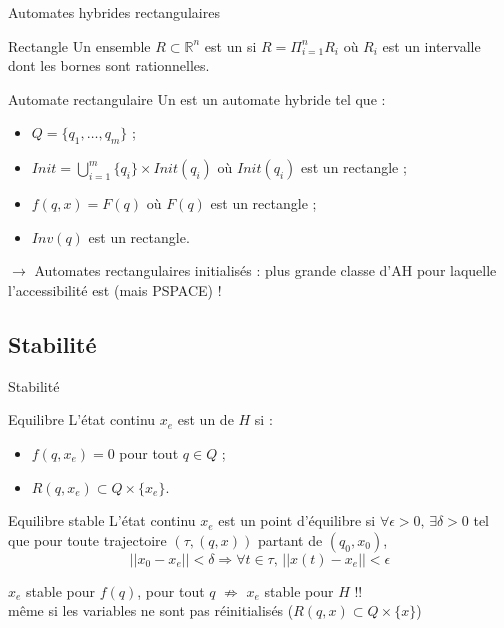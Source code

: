 \documentclass[compress]{beamer}
\begin{document}
\begin{frame}{Automates hybrides rectangulaires}
\begin{block}{Rectangle}
Un ensemble $R \subset \mathbb{R}^n$ est un  si $R = \Pi_{i=1}^n R_i$ où $R_i$ est un intervalle dont les bornes sont rationnelles.
\end{block}
\begin{block}{Automate rectangulaire}
Un  est un automate hybride tel que :
\begin{itemize}
\item $Q = \{q_1, \dots, q_m\}$ ;
\item $Init = \bigcup_{i=1}^m \{q_i\} \times Init(q_i)$ où $Init(q_i)$ est un rectangle ;
\item $f(q,x) = F(q)$ où $F(q)$ est un rectangle ;
\item $Inv(q)$ est un rectangle.
\end{itemize}
\end{block}

$\longrightarrow$ Automates rectangulaires initialisés : plus grande classe d'AH pour laquelle l'accessibilité est  (mais PSPACE) !
\end{frame}

\subsection{Stabilité}
\begin{frame}{Stabilité}
\begin{block}{Equilibre}
L'état continu $x_e$ est un  de $H$ si :
\begin{itemize}
\item $f(q, x_e) = 0$ pour tout $q \in Q$ ;
\item $R(q, x_e) \subset Q \times \{x_e\}$.
\end{itemize}
\end{block}
\begin{block}{Equilibre stable}
L'état continu $x_e$ est un point d'équilibre  si $\forall \epsilon > 0, \, \exists \delta > 0$ tel que pour toute trajectoire $(\tau, (q, x))$ partant de $(q_0, x_0)$,
$$ ||x_0 - x_e|| < \delta \Rightarrow \forall t \in \tau, \, || x(t) - x_e || < \epsilon $$
\end{block}
$x_e$ stable pour $f(q)$, pour tout $q$ $\not\Rightarrow$ $x_e$ stable pour $H$ !!\\
\small même si les variables ne sont pas réinitialisés ($R(q,x) \subset Q \times \{x\}$)
\end{frame}
\end{document}
